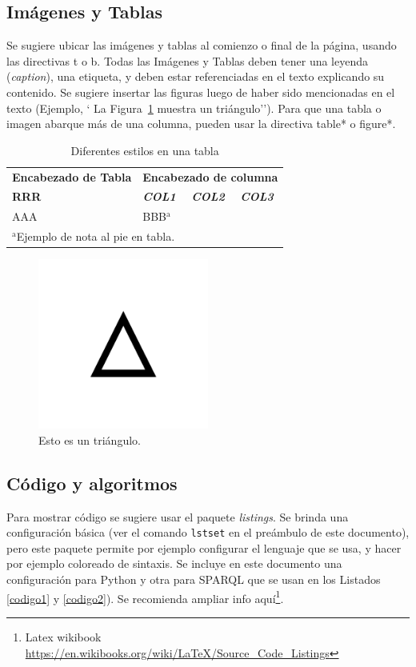 \documentclass[journal,onecolumn]{IEEEtran}
\begin{document}
\subsection{Imágenes y Tablas} Se sugiere ubicar las imágenes y tablas al comienzo o final de la página, usando las directivas t o b. 
Todas las Imágenes y Tablas deben tener una leyenda (\textit{caption}), una etiqueta, y deben estar referenciadas en el texto explicando su contenido.
Se sugiere insertar las figuras luego de haber sido mencionadas en el texto (Ejemplo, ` La Figura~\ref{fig} muestra un triángulo'').
Para que una tabla o imagen abarque más de una columna, pueden usar la directiva table* o figure*. 

\begin{table}[b]
	\caption{Diferentes estilos en una tabla}
	\begin{center}
		\begin{tabularx}{\linewidth}{|X|X|X|X|}
			\hline
			\textbf{Encabezado de Tabla}&\multicolumn{3}{|c|}{\textbf{Encabezado de columna}} \\
			\cline{2-4} 
			\textbf{RRR} & \textbf{\textit{COL1}}& \textbf{\textit{COL2}}& \textbf{\textit{COL3}} \\
			\hline
			AAA& BBB$^{\mathrm{a}}$& &  \\
			\hline
			\multicolumn{4}{l}{$^{\mathrm{a}}$Ejemplo de nota al pie en tabla.}
		\end{tabularx}
		\label{tab1}
	\end{center}
\end{table}

\begin{figure}[t]
	\centerline{\includegraphics[width=0.5\textwidth]{imagenes/triangulo.png}}
	\caption{Esto es un triángulo.}
	\label{fig}
\end{figure}

\subsection{Código y algoritmos}
Para mostrar código se sugiere usar el paquete \textit{listings}. Se brinda una configuración básica (ver el comando \texttt{lstset} en el preámbulo de este documento), pero este paquete permite por ejemplo configurar el lenguaje que se usa, y hacer por ejemplo coloreado de sintaxis. Se incluye en este documento una configuración para Python y otra para SPARQL que se usan en los Listados \ref{codigo1} y \ref{codigo2}). Se recomienda ampliar info aquí\footnote{Latex wikibook \url{https://en.wikibooks.org/wiki/LaTeX/Source_Code_Listings}}.
\end{document}
